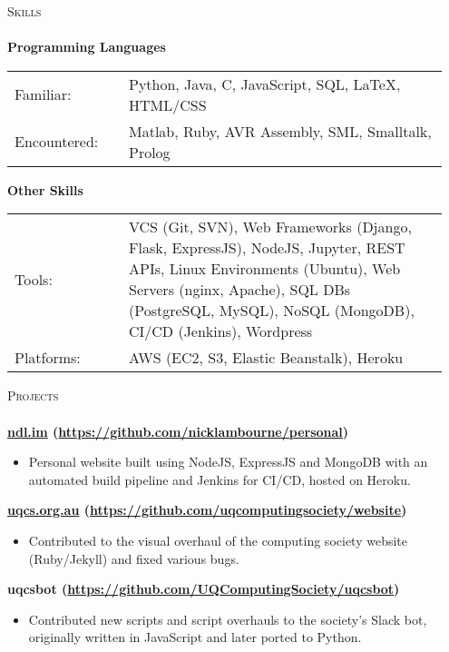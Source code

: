 \documentclass[a4paper]{article}
\newcommand{\lineunder} {
    \vspace*{-8pt} \\
    \hspace*{-18pt} \hrulefill \\
}
\newcommand{\header} [1] {
    {\hspace*{-18pt}\vspace*{6pt} \textsc{#1}}
    \vspace*{-6pt} \lineunder
}
\newenvironment{singleitem}
{   \small
    \vspace{-2.6pt}
    \begin{itemize}
    \setlength{\itemsep}{0pt}
    \setlength{\parskip}{0pt}
    \setlength{\parsep}{0pt}   }
{\end{itemize} \vspace{-2.6pt}	}
\begin{document}
\vspace{-1mm}
\header{Skills}
\textbf{Programming Languages}
\begin{tabular}{p{0.25\linewidth}p{0.7\linewidth}}
	\small Familiar: & \small Python, Java, C, JavaScript, SQL, \LaTeX, HTML/CSS \\
	\small Encountered: & \small Matlab, Ruby, AVR Assembly, SML, Smalltalk, Prolog\\
\end{tabular}
\textbf{Other Skills}
\begin{tabular}{p{0.25\linewidth}p{0.7\linewidth}}
	\small Tools: & \small VCS (Git, SVN), Web Frameworks (Django, Flask, ExpressJS), NodeJS,  Jupyter, REST APIs, Linux Environments (Ubuntu), Web Servers (nginx, Apache), SQL DBs (PostgreSQL, MySQL), NoSQL (MongoDB), CI/CD (Jenkins), Wordpress \\
	\small Platforms: & \small AWS (EC2, S3, Elastic Beanstalk), Heroku  \\
\end{tabular}

\vspace{1mm}


\vspace{1mm}

\header{Projects}
\vspace{1mm}
\textbf{\href{https://ndl.im}{ndl.im} (\href{https://github.com/nicklambourne/personal}{https://github.com/nicklambourne/personal})}
\begin{singleitem}
	\item Personal website built using NodeJS, ExpressJS and MongoDB with an automated build pipeline and Jenkins for CI/CD, hosted on Heroku.
\end{singleitem}

\textbf{\href{https://uqcs.org.au}{uqcs.org.au} (\href{https://github.com/uqcomputingsociety/website}{https://github.com/uqcomputingsociety/website})}
\begin{singleitem}
	\item Contributed to the visual overhaul of the computing society website (Ruby/Jekyll) and fixed various bugs.
\end{singleitem}

\textbf{uqcsbot (\href{https://github.com/UQComputingSociety/uqcsbot}{https://github.com/UQComputingSociety/uqcsbot})}
\begin{singleitem}
	\item Contributed new scripts and script overhauls to the society's Slack bot, originally written in JavaScript and later ported to Python.
\end{singleitem}
\end{document}
